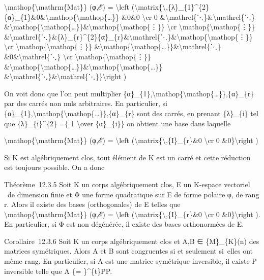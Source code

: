 \documentclass[]{article}
\begin{document}
\textbackslash{}mathop\{\textbackslash{}mathrm\{Mat\}\} (φ,ℰ) =
\textbackslash{}left
(\textbackslash{}matrix\{\textbackslash{},\{λ\}\_\{1\}\^{}\{2\}\{α\}\_\{1\}\&0\&\textbackslash{}mathop\{\textbackslash{}mathop\{\ldots{}\}\}
\&0\&0 \textbackslash{}cr 0
\&\textbackslash{}mathrel\{⋱\}\&\textbackslash{}mathrel\{⋱\}
\&\textbackslash{}mathop\{\textbackslash{}mathop\{\ldots{}\}\}\&\textbackslash{}mathop\{\textbackslash{}mathop\{⋮\}\}
\textbackslash{}cr \textbackslash{}mathop\{\textbackslash{}mathop\{⋮\}\}
\&\textbackslash{}mathrel\{⋱\}\&\{λ\}\_\{r\}\^{}\{2\}\{α\}\_\{r\}\&\textbackslash{}mathrel\{⋱\}\&\textbackslash{}mathop\{\textbackslash{}mathop\{⋮\}\}
\textbackslash{}cr \textbackslash{}mathop\{\textbackslash{}mathop\{⋮\}\}
\&\textbackslash{}mathop\{\textbackslash{}mathop\{\ldots{}\}\}\&\textbackslash{}mathrel\{⋱\}
\&0\&\textbackslash{}mathrel\{⋱\} \textbackslash{}cr
\textbackslash{}mathop\{\textbackslash{}mathop\{⋮\}\}
\&\textbackslash{}mathop\{\textbackslash{}mathop\{\ldots{}\}\}\&\textbackslash{}mathop\{\textbackslash{}mathop\{\ldots{}\}\}
\&\textbackslash{}mathrel\{⋱\}\&\textbackslash{}mathrel\{⋱\}\}\textbackslash{}right
)

On voit donc que l'on peut multiplier
\{α\}\_\{1\},\textbackslash{}mathop\{\textbackslash{}mathop\{\ldots{}\}\},\{α\}\_\{r\}
par des carrés non nuls arbitraires. En particulier, si
\{α\}\_\{1\},\textbackslash{}mathop\{\textbackslash{}mathop\{\ldots{}\}\},\{α\}\_\{r\}
sont des carrés, en prenant \{λ\}\_\{i\} tel que \{λ\}\_\{i\}\^{}\{2\}
=\{ 1 \textbackslash{}over \{α\}\_\{i\}\} on obtient une base dans
laquelle

\textbackslash{}mathop\{\textbackslash{}mathrm\{Mat\}\} (φ,ℰ) =
\textbackslash{}left
(\textbackslash{}matrix\{\textbackslash{},\{I\}\_\{r\}\&0
\textbackslash{}cr 0 \&0\}\textbackslash{}right )

Si K est algébriquement clos, tout élément de K est un carré et cette
réduction est toujours possible. On a donc

Théorème~12.3.5 Soit K un corps algébriquement clos, E un K-espace
vectoriel ~de dimension finie et Φ une forme quadratique sur E de forme
polaire φ, de rang r. Alors il existe des bases (orthogonales) de E
telles que \textbackslash{}mathop\{\textbackslash{}mathrm\{Mat\}\} (φ,ℰ)
= \textbackslash{}left
(\textbackslash{}matrix\{\textbackslash{},\{I\}\_\{r\}\&0
\textbackslash{}cr 0 \&0\}\textbackslash{}right ). En particulier, si Φ
est non dégénérée, il existe des bases orthonormées de E.

Corollaire~12.3.6 Soit K un corps algébriquement clos et A,B ∈
\{M\}\_\{K\}(n) des matrices symétriques. Alors A et B sont congruentes
si et seulement si~elles ont même rang. En particulier, si A est une
matrice symétrique inversible, il existe P inversible telle que A \{=
\}\^{}\{t\}PP.
\end{document}
